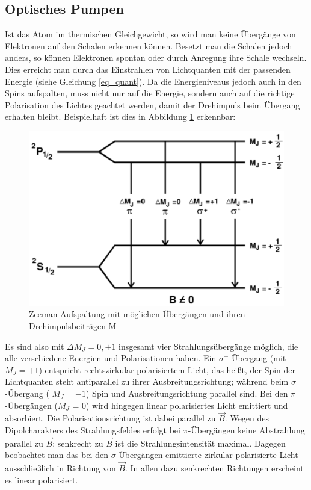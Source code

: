 \subsection{Optisches Pumpen}
Ist das Atom im thermischen Gleichgewicht, so wird man keine Übergänge von Elektronen auf den Schalen erkennen können. Besetzt man die Schalen jedoch anders, so können Elektronen spontan oder durch Anregung ihre Schale wechseln. Dies erreicht man durch das Einstrahlen von Lichtquanten mit der passenden Energie (siehe Gleichung \eqref{eq_quant}). Da die Energieniveaus jedoch auch in den Spins aufspalten, muss nicht nur auf die Energie, sondern auch auf die richtige Polarisation des Lichtes geachtet werden, damit der Drehimpuls beim Übergang erhalten bleibt. Beispielhaft ist dies in Abbildung \ref{pic_uebergang} erkennbar:
\begin{figure}[h]
\includegraphics[scale=.6]{../pics/uebergaenge.pdf}
\caption{Zeeman-Aufspaltung mit möglichen Übergängen und ihren Drehimpulsbeiträgen M}
\label{pic_uebergang}
\end{figure}
Es sind also mit $\Delta M_J =0,\pm 1$ insgesamt vier Strahlungsübergänge möglich, die alle verschiedene Energien und Polarisationen haben. Ein  $\sigma^+$-Übergang (mit  $M_J = +1$) entspricht rechtszirkular-polarisiertem Licht, das heißt, der Spin der Lichtquanten steht antiparallel zu ihrer Ausbreitungsrichtung; während beim $\sigma^-$-Übergang (  $M_J = -1$) Spin und Ausbreitungsrichtung parallel sind. Bei den $\pi$-Übergängen ($M_J$ = 0) wird
hingegen linear polarisiertes Licht emittiert und absorbiert. Die Polarisationsrichtung ist dabei parallel zu $\vec{B}$. Wegen des Dipolcharakters des Strahlungsfeldes erfolgt bei $\pi$-Übergängen keine Abstrahlung parallel zu $\vec{B}$; senkrecht zu $\vec{B}$ ist die Strahlungsintensität maximal. Dagegen beobachtet man das bei den $\sigma$-Übergängen emittierte zirkular-polarisierte Licht ausschließlich in Richtung von $\vec{B}$. In allen dazu senkrechten Richtungen erscheint es linear polarisiert.\\

